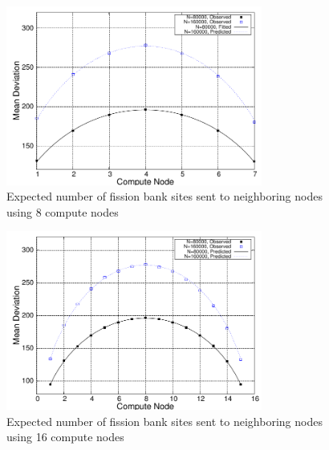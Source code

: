 \documentclass[11pt]{article}
\begin{document}
\clearpage
\begin{figure}[p]
  \centering
  \includegraphics[width=0.75\textwidth]{plot8.pdf}
  \caption{Expected number of fission bank sites sent to neighboring
    nodes using 8 compute nodes}
  \label{fig:mean-deviance8}
\end{figure}

\clearpage
\begin{figure}[p]
  \centering
  \includegraphics[width=0.75\textwidth]{plot16.pdf}
  \caption{Expected number of fission bank sites sent to neighboring
    nodes using 16 compute nodes}
  \label{fig:mean-deviance16}
\end{figure}
\end{document}
